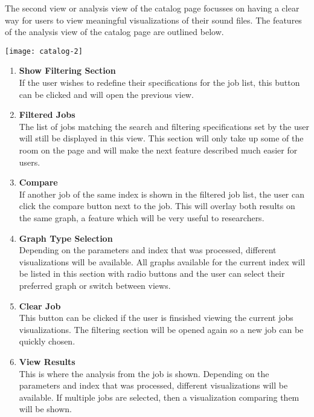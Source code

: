 The second view or analysis view of the catalog page focusses on having a clear way for users to view meaningful visualizations of their sound files. The features of the analysis view of the catalog page are outlined below.\par
\texttt{[image: catalog-2]}
\begin{enumerate}
    \item \textbf{Show Filtering Section}\\ If the user wishes to redefine their specifications for the job list, this button can be clicked and will open the previous view.
    \item \textbf{Filtered Jobs}\\ The list of jobs matching the search and filtering specifications set by the user will still be displayed in this view. This section will only take up some of the room on the page and will make the next feature described much easier for users.
    \item \textbf{Compare}\\ If another job of the same index is shown in the filtered job list, the user can click the compare button next to the job. This will overlay both results on the same graph, a feature which will be very useful to researchers.
    \item \textbf{Graph Type Selection}\\ Depending on the parameters and index that was processed, different visualizations will be available. All graphs available for the current index will be listed in this section with radio buttons and the user can select their preferred graph or switch between views.
    \item \textbf{Clear Job}\\ This button can be clicked if the user is finsished viewing the current jobs visualizations. The filtering section will be opened again so a new job can be quickly chosen.
    \item \textbf{View Results}\\ This is where the analysis from the job is shown. Depending on the parameters and index that was processed, different visualizations will be available. If multiple jobs are selected, then a visualization comparing them will be shown.
\end{enumerate}
